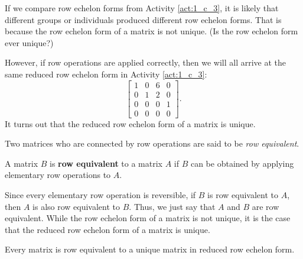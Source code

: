 If we compare row echelon forms from Activity \ref{act:1_c_3}, it is likely that different groups or individuals produced different row echelon forms. That is because the row echelon form of a matrix is not unique. (Is the row echelon form ever unique?)

However, if row operations are applied correctly, then we will all arrive at the same reduced row echelon form in Activity \ref{act:1_c_3}:
\[\left[ \begin{array}{cccc} 1&0&6&0\\ 0&1&2&0 \\ 0&0&0&1\\ 0&0&0&0 \end{array}  \right].\]
It turns out that the reduced row echelon form of a matrix is unique. 

Two matrices who are connected by row operations are said to be \emph{row equivalent}.

\begin{definition} A matrix $B$ is \textbf{row equivalent} to a matrix $A$ if $B$ can be obtained by applying elementary row operations to $A$.
\end{definition}

Since every elementary row operation is reversible, if $B$ is row equivalent to $A$, then $A$ is also row equivalent to $B$. Thus, we just say that $A$ and $B$ are row equivalent. While the row echelon form of a matrix is not unique, it is the case that the reduced row echelon form of a matrix is unique. 

\begin{theorem}Every matrix is row equivalent to a unique matrix in reduced row echelon form.
\end{theorem}

